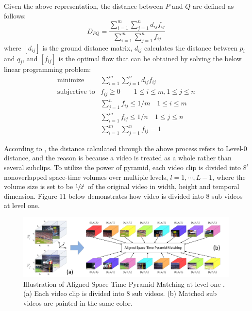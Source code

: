 	\noindent Given the above representation, the distance between $P$ and $Q$ are defined as follows:
	\begin{equation}
	D_{PQ} = \frac{\sum_{i=1}^m \sum_{j=1}^n d_{ij} f_{ij}}{\sum_{i=1}^m\sum_{j=1}^n f_{ij}} 
	\end{equation}
	where $[d_{ij}]$ is the ground distance matrix, $d_{ij}$ calculates the distance between $p_i$ and $q_j$, and $[f_{ij}]$ is the optimal flow that can be obtained by solving the below linear programming problem:
	\begin{eqnarray}
	\text{minimize} & \sum_{i=1}^{m}\sum_{j=1}^{n}d_{ij}f_{ij} \nonumber \\
	\text{subjective to} & f_{ij} \geq 0 \quad \quad 1 \leq i \leq m,  1 \leq j \leq n \nonumber \\
	&\sum_{j=1}^n f_{ij} \leq 1 / m \quad 1 \leq i \leq m \nonumber \\
	&\sum_{i=1}^m f_{ij} \leq 1 / n \quad 1 \leq j \leq n\nonumber \\
	&\sum_{i=1}^{m} \sum_{j=1}^n f_{ij} = 1 
	\end{eqnarray}

	\noindent According to \cite{duan2012visual}, the distance calculated through the above process refers to Level-0 distance, and the reason is because a video is treated as a whole rather than several subclips. To utilize the power of pyramid, each video clip is divided into $8^l$ nonoverlapped space-time volumes over multiple levels, $l = 1,\cdots, L-1$, where the volume size is set to be $\sfrac{1}{2^l}$ of the original video in width, height and temporal dimension. Figure 11 below demonstrates how video is divided into 8 sub videos at level one. 

	\begin{figure}[!ht]
	\centering
		\includegraphics[width=1\linewidth]{./alignedST.png}
	\caption{Illustration of Aligned Space-Time Pyramid Matching at level one \cite{duan2012visual}. (a) Each video clip is divided into 8 sub videos. (b) Matched sub videos are painted in the same color.}
	\end{figure}

